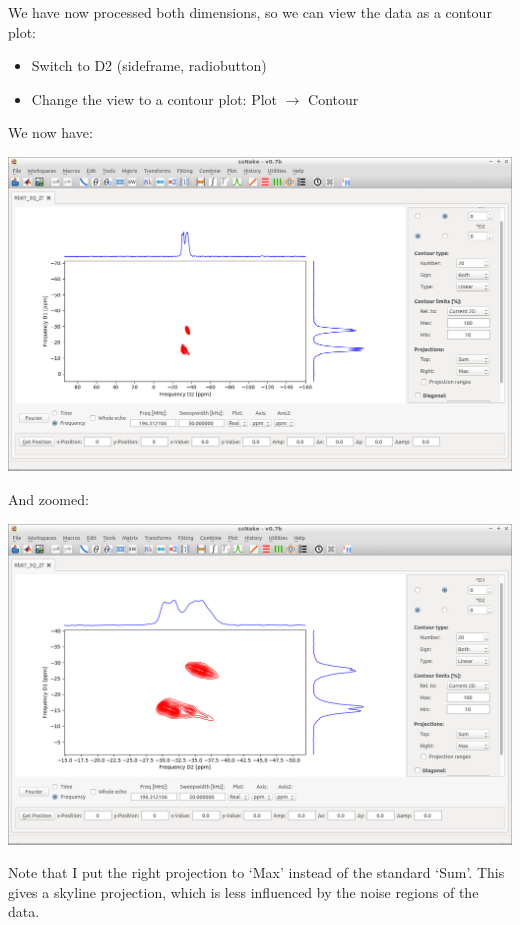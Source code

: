 \documentclass[11pt,a4paper]{article}
\begin{document}
We have now processed both dimensions, so we can view the data as a contour plot:
\begin{itemize}
	\item Switch to D2 (sideframe, radiobutton)
	\item Change the view to a contour plot: Plot  $\longrightarrow$ Contour
\end{itemize}
We now have:
\begin{center}
\includegraphics[width=0.8\linewidth]{Figs/Fig5.png}
\end{center}
And zoomed:
\begin{center}
\includegraphics[width=0.8\linewidth]{Figs/Fig6.png}
\end{center}
Note that I put the right projection to `Max' instead of the standard `Sum'. This gives a skyline
projection, which is less influenced by the noise regions of the data.
\end{document}
